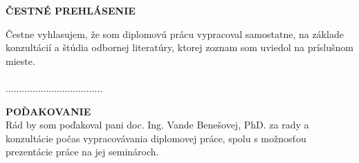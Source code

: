 
\newpage
\cleardoublepage
\thispagestyle{plain}


\vspace*{15cm} 
\begin{large}
\noindent
\textbf{ČESTNÉ PREHLÁSENIE} \\
\end{large}
\noindent
Čestne vyhlasujem, že som diplomovú prácu vypracoval samostatne, na základe
konzultácií a štúdia odbornej literatúry, ktorej zoznam som uviedol na príslušnom mieste.
\\
\vspace*{0.5cm}\\
\hspace*{10cm}....................................\\
\hspace*{10.7cm} \Author


\newpage
\cleardoublepage
\thispagestyle{plain}
\begin{large}
	\noindent
	\textbf{POĎAKOVANIE} \\
	
	Rád by som poďakoval pani doc. Ing. Vande Benešovej, PhD. za rady
	a konzultácie počas vypracovávania diplomovej práce, spolu s možnosťou prezentácie práce na jej seminároch.
	
	
\end{large}
\noindent

\newpage
\null
